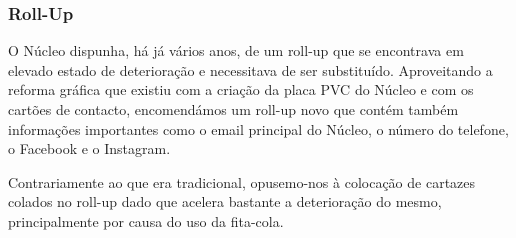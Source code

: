 
\subsubsection{Roll-Up}

O Núcleo dispunha, há já vários anos, de um roll-up que se encontrava em elevado estado de deterioração e necessitava de ser substituído. Aproveitando a reforma gráfica que existiu com a criação da placa PVC do Núcleo e com os cartões de contacto, encomendámos um roll-up novo que contém também informações importantes como o email principal do Núcleo, o número do telefone, o Facebook e o Instagram.

Contrariamente ao que era tradicional, opusemo-nos à colocação de cartazes colados no roll-up dado que acelera bastante a deterioração do mesmo, principalmente por causa do uso da fita-cola.